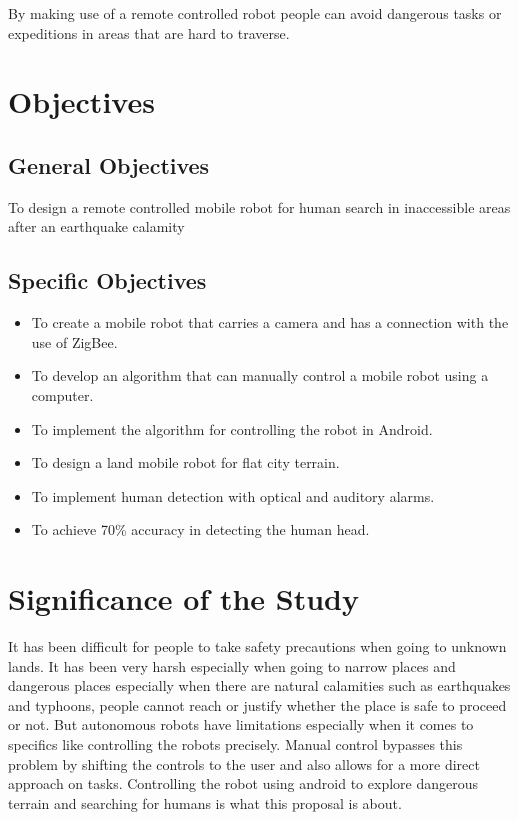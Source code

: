 By making use of a remote controlled robot people can avoid dangerous tasks or expeditions in areas that are hard to traverse.

\section{Objectives}
\subsection{General Objectives}
To design a remote controlled mobile robot for human search in inaccessible areas after an earthquake calamity
\subsection{Specific Objectives}
	
	\begin{itemize}
		\item	To create a mobile robot that carries a camera and has a connection with the use of ZigBee.
\item	To develop an algorithm that can manually control a mobile robot using a computer.
\item	To implement the algorithm for controlling the robot in Android.
\item	To design a land mobile robot for flat city terrain.
\item	To implement human detection with optical and auditory alarms.
\item	To achieve 70\% accuracy in detecting the human head.

	\end{itemize}
	
\section{Significance of the Study}

It has been difficult for people to take safety precautions when going to unknown lands. It has been very harsh especially when going to narrow places and dangerous places especially when there are natural calamities such as earthquakes and typhoons, people cannot reach or justify whether the place is safe to proceed or not. But autonomous robots have limitations especially when it comes to specifics like controlling the robots precisely. Manual control bypasses this problem by shifting the controls to the user and also allows for a more direct approach on tasks. Controlling the robot using android to explore dangerous terrain and searching for humans is what this proposal is about.

